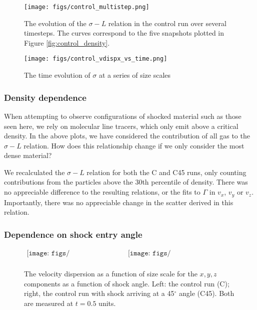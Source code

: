 \documentclass[a4paper,fleqn,usenatbib]{mnras}
\begin{document}
\begin{figure}
\begin{center}
\texttt{[image: figs/control\_multistep.png]}
\end{center}
\caption{The evolution of the $\sigma-L$ relation in the control run over several timesteps.  The curves correspond to the five snapshots plotted in Figure \ref{fig:control_density}. \label{fig:control_multistep}}
\end{figure}


\begin{figure}
\begin{center}
\texttt{[image: figs/control\_vdispx\_vs\_time.png]}
\end{center}
\caption{The time evolution of $\sigma$ at a series of size scales \label{fig:control_sigmatime}}
\end{figure}


\subsubsection{Density dependence \label{sec:density}}

\noindent When attempting to observe configurations of shocked material such as those seen here, we rely on molecular line tracers, which only emit above a critical density.  In the above plots, we have considered the contribution of all gas to the $\sigma-L$ relation.  How does this relationship change if we only consider the most dense material?

We recalculated the $\sigma-L$ relation for both the C and C45 runs, only counting contributions from the particles above the 30th percentile of density.  There was no appreciable difference to the resulting relations, or the fits to $\Gamma$ in $v_x$, $v_y$ or $v_z$.  Importantly, there was no appreciable change in the scatter derived in this relation.

\subsubsection{Dependence on shock entry angle}

\begin{figure*}
\begin{center}$\begin{array}{cc}
\texttt{[image: figs/allvdisp\_control.png]} &
\texttt{[image: figs/allvdisp\_control\_45.png]} \\
\end{array}$
\end{center}
\caption{The velocity dispersion as a function of size scale for the $x,y,z$ components as a function of shock angle.  Left: the control run (C); right, the control run with shock arriving at a 45$^\circ$ angle (C45).  Both are measured at $t=0.5$ units. \label{fig:control_angle}}
\end{figure*}
\end{document}
